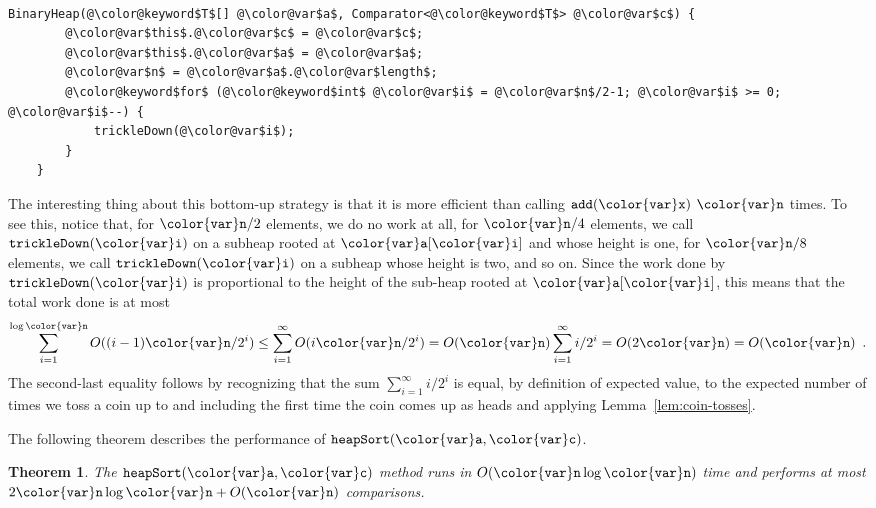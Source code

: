 \documentclass[10pt]{book}
\theoremstyle{plain}
\newtheorem{thm}{Theorem}[chapter]
\newcommand{\lemref}[1]{Lemma~\ref{lem:#1}}
\theoremstyle{definition}
\begin{document}
 \ \vspace{.5ex}\begin{Verbatim}[gobble=1,tabsize=2,frame=single,framerule=1.2pt,commandchars=\\@\$,label=\texttt{BinaryHeap},labelposition=topline]
	BinaryHeap(@\color@keyword$T$[] @\color@var$a$, Comparator<@\color@keyword$T$> @\color@var$c$) {
		@\color@var$this$.@\color@var$c$ = @\color@var$c$;
		@\color@var$this$.@\color@var$a$ = @\color@var$a$;
		@\color@var$n$ = @\color@var$a$.@\color@var$length$;
		@\color@keyword$for$ (@\color@keyword$int$ @\color@var$i$ = @\color@var$n$/2-1; @\color@var$i$ >= 0; @\color@var$i$--) {
			trickleDown(@\color@var$i$);
		}
	}
\end{Verbatim}


The interesting thing about this bottom-up strategy is that it is more
efficient than calling \ensuremath{\mathtt{add({\color{var}x})}} \ensuremath{\mathtt{{\color{var}n}}} times.  To see this, notice that,
for $\ensuremath{\mathtt{{\color{var}n}}}/2$ elements, we do no work at all, for $\ensuremath{\mathtt{{\color{var}n}}}/4$ elements, we call
\ensuremath{\mathtt{trickleDown({\color{var}i})}} on a subheap rooted at \ensuremath{\mathtt{{\color{var}a}[{\color{var}i}]}} and whose height is one, for
$\ensuremath{\mathtt{{\color{var}n}}}/8$ elements, we call \ensuremath{\mathtt{trickleDown({\color{var}i})}} on a subheap whose height is two,
and so on.  Since the work done by \ensuremath{\mathtt{trickleDown({\color{var}i})}} is proportional to
the height of the sub-heap rooted at \ensuremath{\mathtt{{\color{var}a}[{\color{var}i}]}}, this means that the total
work done is at most
\[
    \sum_{i=1}^{\log\ensuremath{\mathtt{{\color{var}n}}}} O((i-1)\ensuremath{\mathtt{{\color{var}n}}}/2^{i})
    \le \sum_{i=1}^{\infty} O(i\ensuremath{\mathtt{{\color{var}n}}}/2^{i})
    = O(\ensuremath{\mathtt{{\color{var}n}}})\sum_{i=1}^{\infty} i/2^{i}
    =  O(2\ensuremath{\mathtt{{\color{var}n}}}) = O(\ensuremath{\mathtt{{\color{var}n}}}) \enspace .
\]
The second-last equality follows by recognizing that the sum
$\sum_{i=1}^{\infty} i/2^{i}$ is equal, by definition of expected value,
to the expected number of times we toss a coin up to and including the
first time the coin comes up as heads and applying \lemref{coin-tosses}.

The following theorem describes the performance of \ensuremath{\mathtt{heapSort({\color{var}a},{\color{var}c})}}.
\begin{thm}
  The \ensuremath{\mathtt{heapSort({\color{var}a},{\color{var}c})}} method runs in $O(\ensuremath{\mathtt{{\color{var}n}}}\log \ensuremath{\mathtt{{\color{var}n}}})$ time and performs at
  most $2\ensuremath{\mathtt{{\color{var}n}}}\log \ensuremath{\mathtt{{\color{var}n}}} + O(\ensuremath{\mathtt{{\color{var}n}}})$ comparisons.
\end{thm}
\end{document}
